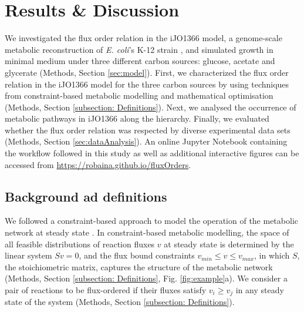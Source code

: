 \documentclass[12pt]{article}
\begin{document}
\section{Results \& Discussion}
We investigated the flux order relation in the iJO1366 model, a genome-scale metabolic reconstruction of \emph{E. coli}'s K-12 strain \cite{Orth2014}, and simulated growth in minimal medium under three different carbon sources: glucose, acetate and glycerate (Methods, Section \ref{sec:model}). First, we characterized the flux order relation in the iJO1366 model for the three carbon sources by using techniques from constraint-based metabolic modelling and mathematical optimisation (Methods, Section \ref{subsection: Definitions}). Next, we analysed the occurrence of metabolic pathways in iJO1366 along the hierarchy. Finally, we evaluated whether the flux order relation was respected by diverse experimental data sets (Methods, Section \ref{sec:dataAnalysis}). An online Jupyter Notebook containing the workflow followed in this study as well as additional interactive figures can be accessed from \url{https://robaina.github.io/fluxOrders}.

\subsection{Background ad definitions}
We followed a constraint-based approach to model the operation of the metabolic network at steady state \cite{Orth2010}. In constraint-based metabolic modelling, the space of all feasible distributions of reaction fluxes $v$ at steady state is determined by the linear system $Sv = 0$, and the flux bound constraints $v_{min} \leq v \leq v_{max}$, in which $S$, the stoichiometric matrix, captures the structure of the metabolic network (Methods, Section \ref{subsection: Definitions}, Fig. \ref{fig:example}a). We consider a pair of reactions to be flux-ordered if their fluxes satisfy $v_i \geq v_j$ in any steady state of the system (Methods, Section \ref{subsection: Definitions}).
\end{document}
